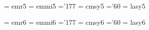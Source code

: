  \font\fivrm  = emr5               %
 \font\fivmi  = emmi5              %
    \skewchar\fivmi ='177          %
 \font\fivsy  = cmsy5              %
    \skewchar\fivsy ='60           %
 \font\fivly  = lasy5             %
 
 \font\sixrm  = emr6               %
 \font\sixmi  = emmi6              %
    \skewchar\sixmi ='177          %
 \font\sixsy  = cmsy6              %
    \skewchar\sixsy ='60           %
 \font\sixly  = lasy6             %
 
